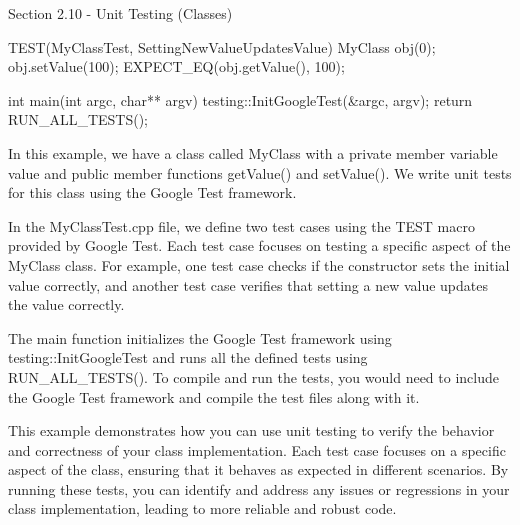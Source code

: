 \begin{notes}{Section 2.10 - Unit Testing (Classes)}
\begin{highlight}
\begin{code}[C++]
    TEST(MyClassTest, SettingNewValueUpdatesValue) {
        MyClass obj(0);
        obj.setValue(100);
        EXPECT_EQ(obj.getValue(), 100);
    }
    
    int main(int argc, char** argv) {
        testing::InitGoogleTest(&argc, argv);
        return RUN_ALL_TESTS();
    }        
    \end{code}
        In this example, we have a class called MyClass with a private member variable value and public member functions getValue() and setValue(). We write unit tests for this class using the Google Test framework.
    
        In the MyClassTest.cpp file, we define two test cases using the TEST macro provided by Google Test. Each test case focuses on testing a specific aspect of the MyClass class. For example, one test case checks if the constructor sets the initial value correctly, and another 
        test case verifies that setting a new value updates the value correctly.
    
        The main function initializes the Google Test framework using testing::InitGoogleTest and runs all the defined tests using RUN\_ALL\_TESTS(). To compile and run the tests, you would need to include the Google Test framework and compile the test files along with it.
    
        This example demonstrates how you can use unit testing to verify the behavior and correctness of your class implementation. Each test case focuses on a specific aspect of the class, ensuring that it behaves as expected in different scenarios. By running these tests, you can 
        identify and address any issues or regressions in your class implementation, leading to more reliable and robust code.
    \end{highlight}
\end{notes}

